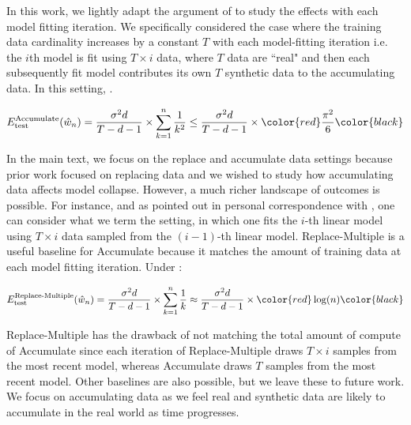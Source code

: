 In this work, we lightly adapt the argument of \citet{dohmatob2024model} to study the effects  with each model fitting iteration. We specifically considered the case where the training data cardinality increases by a constant $T$ with each model-fitting iteration i.e. the $i$th model is fit using $T\times i$ data, where $T$ data are ``real" and then each subsequently fit model contributes its own $T$ synthetic data to the accumulating data. In this setting, .

\begin{equation}
E_{\text{test}}^{\text{Accumulate}}(\hat{w}_n) = \frac{\sigma^2 d}{T - d -1} \times \sum_{k=1}^n \dfrac{1}{k^2} \leq \frac{\sigma^2 d}{T - d -1} \times \color{red}\frac{\pi^2}{6} \color{black}
\end{equation}

In the main text, we focus on the replace and accumulate data settings because prior work focused on replacing data and we wished to study how accumulating data affects model collapse. However, a much richer landscape of outcomes is possible. For instance, and as pointed out in personal correspondence with \citet{dohmatob2024model}, one can consider what we term the  setting, in which one fits the $i$-th linear model using $T\times i$ data sampled from the $(i-1)$-th linear model. Replace-Multiple is a useful baseline for Accumulate because it matches the amount of training data at each model fitting iteration. Under :

\begin{equation}
E_{\text{test}}^{\text{Replace-Multiple}}(\hat{w}_n) = \frac{\sigma^2 d}{T - d -1} \times \sum_{k=1}^n \dfrac{1}{k} \approx \frac{\sigma^2 d}{T - d -1} \times \color{red} \log(n) \color{black}
\end{equation}

Replace-Multiple has the drawback of not matching the total amount of compute of Accumulate since each iteration of Replace-Multiple draws $T\times i$ samples from the most recent model, whereas Accumulate draws $T$ samples from the most recent model. 
Other baselines are also possible, but we leave these to future work. We focus on accumulating data as we feel real and synthetic data are likely to accumulate in the real world as time progresses.

\clearpage
